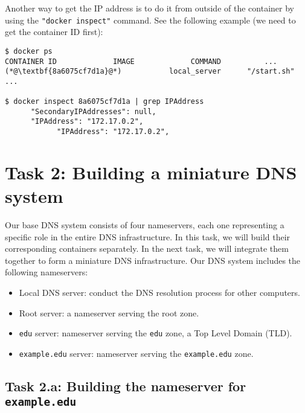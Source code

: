  
Another way to get the IP address is to do it from outside of the container
by using the \texttt{"docker inspect"} command. See the 
following example (we need to get the container ID first):

\begin{lstlisting}
$ docker ps
CONTAINER ID             IMAGE             COMMAND          ...
(*@\textbf{8a6075cf7d1a}@*)           local_server      "/start.sh"        ...

$ docker inspect 8a6075cf7d1a | grep IPAddress
      "SecondaryIPAddresses": null,
      "IPAddress": "172.17.0.2",
            "IPAddress": "172.17.0.2",
\end{lstlisting}
 




\section{Task 2: Building a miniature DNS system}

Our base DNS system consists of four nameservers, each one representing 
a specific role in the entire DNS infrastructure. In this task, we 
will build their corresponding containers separately. In the next
task, we will integrate them together to form a miniature DNS infrastructure. 
Our DNS system includes the following nameservers: 

\begin{itemize}[nosep]
\item Local DNS server: conduct the DNS resolution process for other computers.
\item Root server: a nameserver serving the root zone.
\item \texttt{edu} server: nameserver serving the \texttt{edu} zone, a Top Level Domain (TLD).  
\item \texttt{example.edu} server: nameserver serving the \texttt{example.edu} zone. 
\end{itemize}
 


\subsection{Task 2.a: Building the nameserver for \texttt{example.edu}}

